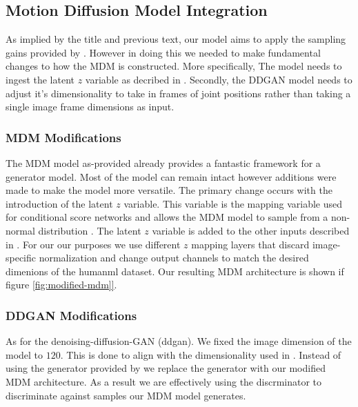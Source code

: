\documentclass[10pt,twocolumn,letterpaper]{article}
\begin{document}
\subsection{Motion Diffusion Model Integration}
As implied by the title and previous text, our model aims to apply the sampling gains provided by \cite{Xiao22}. However in doing this we needed to make fundamental changes to how the MDM is constructed. More specifically, The model needs to ingest the latent $z$ variable as decribed in \cite{Xiao22}. Secondly, the DDGAN model needs to adjust it's dimensionality to take in frames of joint positions rather than taking a single image frame dimensions as input.

\subsubsection{MDM Modifications}

The MDM model as-provided already provides a fantastic framework for a generator model. Most of the model can remain intact however additions were made to make the model more versatile. The primary change occurs with the introduction of the latent $z$ variable. This variable is the mapping variable used for conditional score networks and allows the MDM model to sample from a non-normal distribution \cite{xiao2022tackling}. The latent $z$ variable is added to the other inputs described in \cite{Tevet23}. For our our purposes we use different $z$ mapping layers that discard image-specific normalization and change output channels to match the desired dimenions of the humanml dataset.  Our resulting MDM architecture is shown if figure \ref{fig:modified-mdm]}. \par

\subsubsection{DDGAN Modifications}\label{sec:ddgan-mod}

As for the denoising-diffusion-GAN (ddgan). We fixed the image dimension of the model to $120$. This is done to align with the dimensionality used in \cite{Guo_2022_CVPR}. Instead of using the generator provided by \cite{Xiao22} we replace the generator with our modified MDM architecture. As a result we are effectively using the discrminator to discriminate against samples our MDM model generates. \par 
\end{document}
